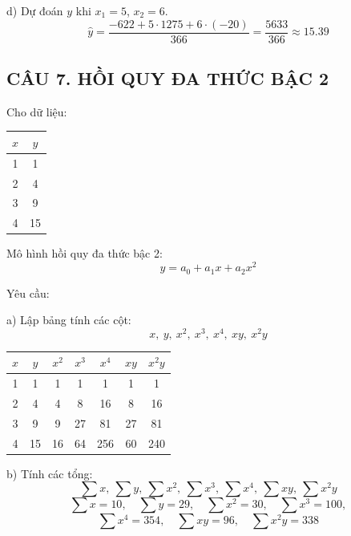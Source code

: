 \documentclass[a4paper,12pt]{article}
\begin{document}
d) Dự đoán $y$ khi $x_1 = 5$, $x_2 = 6$.
\[ \hat{y} = \frac{-622 + 5 \cdot 1275 + 6 \cdot (-20)}{366} = \frac{5633}{366} \approx 15.39 \]

\subsection*{CÂU 7. HỒI QUY ĐA THỨC BẬC 2}

Cho dữ liệu:
\begin{center}
\begin{tabular}{|c|c|}
\hline
$x$ & $y$ \\
\hline
1 & 1 \\
2 & 4 \\
3 & 9 \\
4 & 15 \\
\hline
\end{tabular}
\end{center}

Mô hình hồi quy đa thức bậc 2:
\[ y = a_0 + a_1 x + a_2 x^2 \]

Yêu cầu:

a) Lập bảng tính các cột:
\[ x,\ y,\ x^2,\ x^3,\ x^4,\ xy,\ x^2 y \]
\begin{center}
\begin{tabular}{|c|c|c|c|c|c|c|}
\hline
$x$ & $y$ & $x^2$ & $x^3$ & $x^4$ & $xy$ & $x^2 y$ \\
\hline
1 & 1 & 1 & 1 & 1 & 1 & 1 \\
2 & 4 & 4 & 8 & 16 & 8 & 16 \\
3 & 9 & 9 & 27 & 81 & 27 & 81 \\
4 & 15 & 16 & 64 & 256 & 60 & 240 \\
\hline
\end{tabular}
\end{center}

b) Tính các tổng:
\[ \sum x,\ \sum y,\ \sum x^2,\ \sum x^3,\ \sum x^4,\ \sum xy,\ \sum x^2 y \]
\[ \sum x = 10, \quad \sum y = 29, \quad \sum x^2 = 30, \quad \sum x^3 = 100, \]
\[ \sum x^4 = 354, \quad \sum xy = 96, \quad \sum x^2 y = 338 \]
\end{document}
